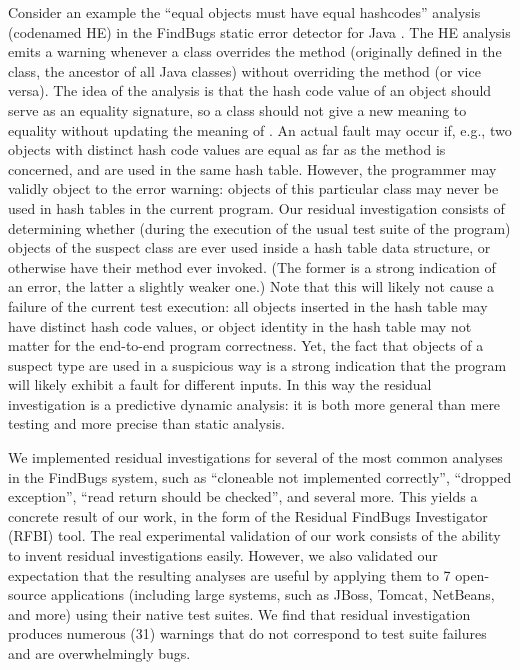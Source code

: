 \documentclass[proposal]{umthesis} %
\begin{document}
Consider an example the ``equal objects must have equal hashcodes''
analysis (codenamed HE) in the FindBugs static error detector for Java
\cite{hovemeyer04finding,hovemeyer07finding,Ayewah:2010:GFF:1831708.1831738}. The HE
analysis emits a warning whenever a class overrides the method
 (originally defined in the  class, the
ancestor of all Java classes) without overriding the 
method (or vice versa). The idea of the analysis is that the hash code
value of an object should serve as an equality signature, so a class
should not give a new meaning to equality without updating the meaning
of . An actual fault may occur if, e.g., two objects
with distinct hash code values are equal as far as the 
method is concerned, and are used in the same hash table. 
However, the programmer may validly object to the error
warning: objects of this particular class may never be used
in hash tables in the current program.  Our residual investigation
consists of determining whether (during the execution of the usual
test suite of the program) objects of the suspect class are ever
used inside a hash table data structure, or otherwise have their
 method ever invoked. (The former is a strong indication
of an error, the latter a slightly weaker one.)  Note that this will
likely not cause a failure of the current test execution: all objects
inserted in the hash table may have distinct hash code values, or
object identity in the hash table may not matter for the end-to-end
program correctness. Yet, the fact that objects of a suspect type
are used in a suspicious way is a strong indication that the
program will likely exhibit a fault for different inputs. In this way
the residual investigation is a predictive dynamic analysis: it is
both more general than mere testing and more precise than static analysis.

We implemented residual investigations for several of the most common analyses in the FindBugs system, such as “cloneable not implemented correctly”, “dropped exception”, “read return should be checked”, and several more. This yields a concrete result of our work, in the form of the Residual FindBugs Investigator (RFBI) tool.  The real experimental validation of our work consists of the ability to invent residual investigations easily. However, we also validated our expectation that the resulting analyses are useful by applying them to 7 open-source applications (including large systems, such as JBoss, Tomcat, NetBeans, and more) using their native test suites. We find that residual investigation produces numerous (31) warnings that do not correspond to test suite failures and are overwhelmingly bugs.
\end{document}
